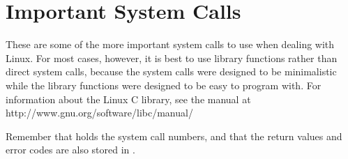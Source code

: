 \chapter{Important System Calls}
\label{syscallap}

% 
% 
% 
% 

These are some of the more important system calls to use when dealing with
Linux.  For most cases, however, it is best to use library functions rather
than direct system calls, because the system calls were designed to be
minimalistic while the library functions were designed to be easy to
program with.  For information about the Linux C library, see the manual
at http://www.gnu.org/software/libc/manual/

Remember that {\eaxRegIdx} holds the system call numbers, and that the
return values and error codes are also stored in {\eaxReg}.

